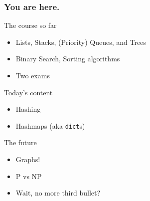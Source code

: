 \begin{frame}
	\frametitle{You are here.}
	\begin{block}{The course so far}
		\begin{itemize}
			\item Lists, Stacks, (Priority) Queues, and Trees
			\item Binary Search, Sorting algorithms
			\item Two exams
		\end{itemize}
	\end{block}
	\pause
	\begin{exampleblock}{Today's content}
		\begin{itemize}
			\item Hashing
			\item Hashmaps (aka \texttt{dict}s)
		\end{itemize}
	\end{exampleblock}
	\pause
	\begin{block}{The future}
		\begin{itemize}
			\item Graphs!
			\item P vs NP
			\item Wait, no more third bullet?
		\end{itemize}
	\end{block}
\end{frame}
